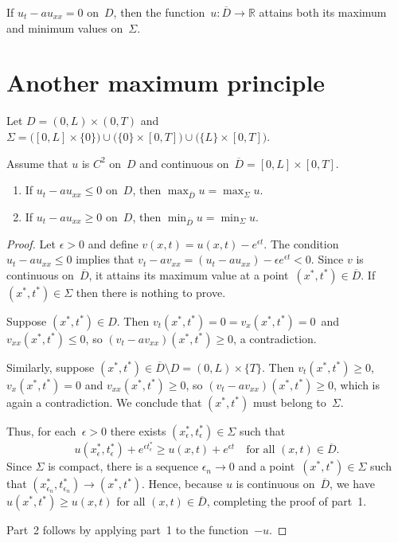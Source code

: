 \begin{corollary}
If $u_t-au_{xx}=0$ on~$D$, then the function~$u:\overline{D}\to\mathbb{R}$
attains both its maximum and minimum values on~$\Sigma$.
\end{corollary}

\section{Another maximum principle}

Let $D=(0,L)\times(0,T)$ and
$\Sigma=\bigl([0,L]\times\{0\})\cup\bigl(\{0\}\times[0,T]\bigr)\cup
\bigl(\{L\}\times[0,T]\bigr)$.

\begin{theorem}
Assume that $u$ is $C^2$ on~$D$ and continuous
on~$\overline{D}=[0,L]\times[0,T]$.
\begin{enumerate}
\item If $u_t-au_{xx}\le0$ on~$D$, then $\max_{\overline{D}}u=\max_\Sigma u$.
\item If $u_t-au_{xx}\ge0$ on~$D$, then $\min_{\overline{D}}u=\min_\Sigma u$.
\end{enumerate}
\end{theorem}
\begin{proof}
Let $\epsilon>0$ and define $v(x,t)=u(x,t)-e^{\epsilon t}$.  The condition
$u_t-au_{xx}\le0$ implies that
$v_t-av_{xx}=(u_t-au_{xx})-\epsilon e^{\epsilon t}<0$.  Since $v$ is continuous
on~$\overline{D}$, it attains its maximum value at a
point~$(x^*,t^*)\in\overline{D}$.  If $(x^*,t^*)\in\Sigma$ then there is
nothing to prove.

Suppose $(x^*,t^*)\in D$.  Then $v_t(x^*,t^*)=0=v_x(x^*,t^*)=0$~and
$v_{xx}(x^*,t^*)\le0$, so $(v_t-av_{xx})(x^*,t^*)\ge0$, a contradiction.

Similarly, suppose $(x^*,t^*)\in\overline{D}\setminus D=(0,L)\times\{T\}$.
Then $v_t(x^*,t^*)\ge0$, $v_x(x^*,t^*)=0$ and $v_{xx}(x^*,t^*)\ge0$, so
$(v_t-av_{xx})(x^*,t^*)\ge0$, which is again a contradiction.  We conclude that
$(x^*,t^*)$ must belong to~$\Sigma$.

Thus, for each~$\epsilon>0$ there exists $(x^*_\epsilon,t^*_\epsilon)\in\Sigma$
such that
\[
u(x^*_\epsilon,t^*_\epsilon)+e^{\epsilon t^*_\epsilon}
	\ge u(x,t)+e^{\epsilon t}\quad\text{for all $(x,t)\in\overline{D}$.}
\]
Since $\Sigma$ is compact, there is a sequence $\epsilon_n\to0$ and a
point~$(x^*,t^*)\in\Sigma$ such that
$(x^*_{\epsilon_n},t^*_{\epsilon_n})\to(x^*,t^*)$.  Hence, because $u$ is
continuous on~$\overline{D}$, we have $u(x^*,t^*)\ge u(x,t)$ for all
$(x,t)\in\overline{D}$, completing the proof of part~1.

Part~2 follows by applying part~1 to the function~$-u$.
\end{proof}

